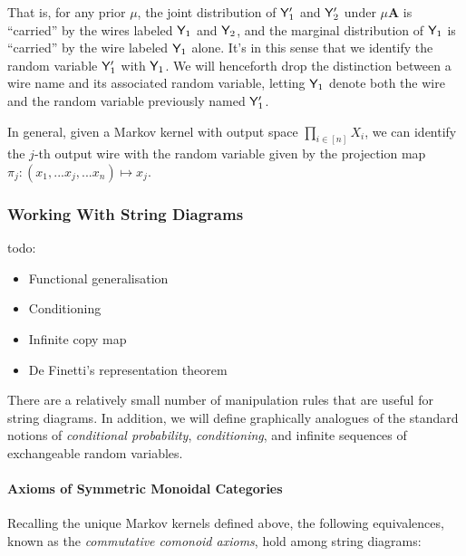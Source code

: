 \begin{example}
That is, for any prior $\mu$, the joint distribution of $\mathsf{Y}'_1$ and $\mathsf{Y}'_2$ under $\mu\mathbf{A}$ is ``carried'' by the wires labeled $\mathsf{Y}_1$ and $\mathsf{Y}_2$, and the marginal distribution of $\mathsf{Y}_1$ is ``carried'' by the wire labeled $\mathsf{Y}_1$ alone. It's in this sense that we identify the random variable $\mathsf{Y}'_1$ with $\mathsf{Y}_1$. We will henceforth drop the distinction between a wire name and its associated random variable, letting $\mathsf{Y}_1$ denote both the wire and the random variable previously named $\mathsf{Y}'_1$.

In general, given a Markov kernel with output space $\prod_{i\in [n]} X_i$, we can identify the $j$-th output wire with the random variable given by the projection map $\pi_j:(x_1,...x_j,...x_n)\mapsto x_j$. 
\end{example}

\subsubsection{Working With String Diagrams}

todo:
\begin{itemize}
\item Functional generalisation
\item Conditioning
\item Infinite copy map
\item De Finetti's representation theorem
\end{itemize}

There are a relatively small number of manipulation rules that are useful for string diagrams. In addition, we will define graphically analogues of the standard notions of \emph{conditional probability}, \emph{conditioning}, and infinite sequences of exchangeable random variables.

\paragraph{Axioms of Symmetric Monoidal Categories}

Recalling the unique Markov kernels defined above, the following equivalences, known as the \emph{commutative comonoid axioms}, hold among string diagrams:


